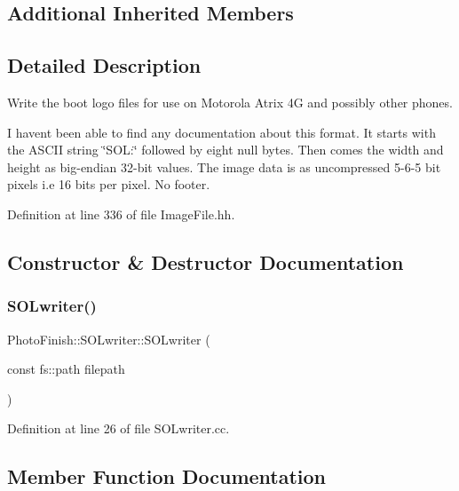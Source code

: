 \subsection*{Additional Inherited Members}


\subsection{Detailed Description}
Write the boot logo files for use on Motorola Atrix 4G and possibly other phones. 

I haven\textquotesingle{}t been able to find any documentation about this format. It starts with the A\+S\+C\+II string \char`\"{}\+S\+O\+L\+:\char`\"{} followed by eight null bytes. Then comes the width and height as big-\/endian 32-\/bit values. The image data is as uncompressed 5-\/6-\/5 bit pixels i.\+e 16 bits per pixel. No footer. 

Definition at line 336 of file Image\+File.\+hh.



\subsection{Constructor \& Destructor Documentation}
\mbox{\label{class_photo_finish_1_1_s_o_lwriter_aac400059e73657e362495d15725f8b9f}} 
\subsubsection{\texorpdfstring{S\+O\+Lwriter()}{SOLwriter()}}
{\footnotesize\ttfamily Photo\+Finish\+::\+S\+O\+Lwriter\+::\+S\+O\+Lwriter (\begin{DoxyParamCaption}\item[{const fs\+::path}]{filepath }\end{DoxyParamCaption})}



Definition at line 26 of file S\+O\+Lwriter.\+cc.



\subsection{Member Function Documentation}
\mbox{\label{class_photo_finish_1_1_s_o_lwriter_a5d3c9c3b3e289bc3cf5360b3bf2c2837}} 
